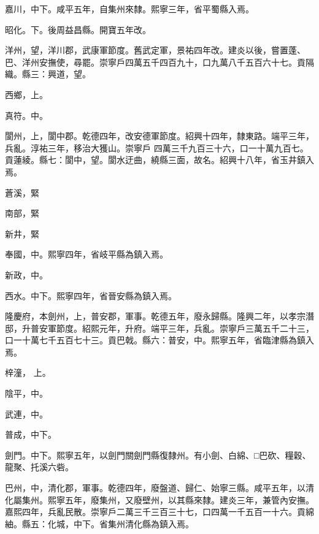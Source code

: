 \begin{pinyinscope}
 嘉川，中下。咸平五年，自集州來隸。熙寧三年，省平蜀縣入焉。



 昭化。下。後周益昌縣。開寶五年改。



 洋州，望，洋川郡，武康軍節度。舊武定軍，景祐四年改。建炎以後，嘗置蓬、巴、洋州安撫使，尋罷。崇寧戶四萬五千四百九十，口九萬八千五百六十七。貢隔織。縣三：興道，望。



 西鄉，上。



 真符。中。



 閬州，上，閬中郡。乾德四年，改安德軍節度。紹興十四年，隸東路。端平三年，兵亂。淳祐三年，移治大獲山。崇寧戶
 四萬三千九百三十六，口一十萬九百七。貢蓮綾。縣七：閬中，望。閬水迂曲，繞縣三面，故名。紹興十八年，省玉井鎮入焉。



 蒼溪，緊



 南部，緊



 新井，緊



 奉國，中。熙寧四年，省岐平縣為鎮入焉。



 新政，中。



 西水。中下。熙寧四年，省晉安縣為鎮入焉。



 隆慶府，本劍州，上，普安郡，軍事。乾德五年，廢永歸縣。隆興二年，以孝宗潛邸，升普安軍節度。紹熙元年，升府。端平三年，兵亂。崇寧戶三萬五千二十三，口一十萬七千五百七十三。貢巴戟。縣六：普安，中。熙寧五年，省臨津縣為鎮入焉。



 梓潼，
 上。



 陰平，中。



 武連，中。



 普成，中下。



 劍門。中下。熙寧五年，以劍門關劍門縣復隸州。有小劍、白綿、□巴砍、糧穀、龍聚、托溪六砦。



 巴州，中，清化郡，軍事。乾德四年，廢盤道、歸仁、始寧三縣。咸平五年，以清化屬集州。熙寧五年，廢集州，又廢壁州，以其縣來隸。建炎三年，兼管內安撫。嘉熙四年，兵亂民散。崇寧戶二萬三千三百三十七，口四萬一千五百一十六。貢綿紬。縣五：化城，中下。省集州清化縣為鎮入焉。




\end{pinyinscope}
